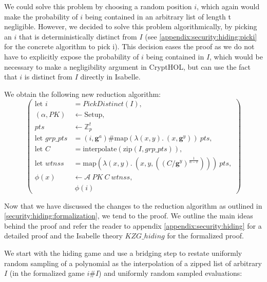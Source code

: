 We could solve this problem by choosing a random position $i$, which again would make the probability of $i$ being contained in an arbitrary list of length t negligible. However, we decided to solve this problem algorithmically, by picking an $i$ that is deterministically distinct from $I$ (see \ref{appendix:security:hiding:picki} for the concrete algorithm to pick i). This decision eases the proof as we do not have to explicitly expose the probability of $i$ being contained in $I$, which would be necessary to make a negligibility argument in CryptHOL, but can use the fact that $i$ is distinct from $I$ directly in Isabelle.

We obtain the following new reduction algorithm: 
\begin{equation*}
    \left(
        \begin{aligned}
            \text{let } i &= PickDistinct(I), \\
            (\alpha,PK) & \leftarrow \text{Setup}, \\
            pts & \leftarrow \mathbb{Z}_p^t\\
            \text{let } grp\_pts &= (i,\mathbf{g}^a)\#\text{map} (\lambda (x,y).\ (x,\mathbf{g}^y))\ pts,\\
            \text{let } C &= \text{interpolate} (\text{zip}(I,grp\_pts)),\\ 
            \text{let } wtnss &= \text{map} (\lambda (x,y).\ (x,y, ((C/\mathbf{g}^y)^{\frac{1}{\alpha-x}})))\ pts,\\
            \phi(x) & \leftarrow \mathcal{A}\ PK \ C\ wtnss, \\
            & \ \phi(i)
        \end{aligned}
    \right)
\end{equation*}

Now that we have discussed the changes to the reduction algorithm as outlined in \ref{security:hiding:formalization}, we tend to the proof. We outline the main ideas behind the proof and refer the reader to appendix \ref{appendix:security:hiding} for a detailed proof and the Isabelle theory $KZG\_hiding$ for the formalized proof.

We start with the hiding game and use a bridging step to restate uniformly random sampling of a polynomial as the interpolation of a zipped list of arbitrary $I$ (in the formalized game $i\#I$) and uniformly random sampled evaluations: 


